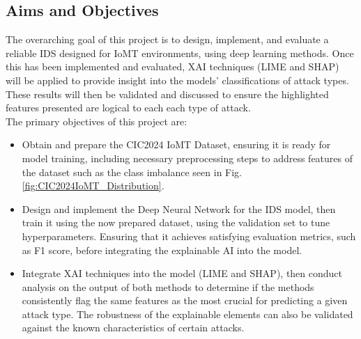 \documentclass[11pt,a4paper]{article}
\begin{document}
\subsection{Aims and Objectives}
The overarching goal of this project is to design, implement, and evaluate a reliable IDS designed for IoMT environments, using deep learning methods. Once this has been implemented and evaluated, XAI techniques (LIME and SHAP) will be applied to provide insight into the models’ classifications of attack types. These results will then be validated and discussed to ensure the highlighted features presented are logical to each each type of attack.
\\
The primary objectives of this project are: 
\begin{itemize}
    \item Obtain and prepare the CIC2024 IoMT Dataset, ensuring it is ready for model training, including necessary preprocessing steps to address features of the dataset such as the class imbalance seen in Fig. \ref{fig:CIC2024IoMT_Distribution}.
    \item Design and implement the Deep Neural Network for the IDS model, then train it using the now prepared dataset, using the validation set to tune hyperparameters. Ensuring that it achieves satisfying evaluation metrics, such as F1 score, before integrating the explainable AI into the model.
    \item Integrate XAI techniques into the model (LIME and SHAP), then conduct analysis on the output of both methods to determine if the methods consistently flag the same features as the most crucial for predicting a given attack type. The robustness of the explainable elements can also be validated against the known characteristics of certain attacks. 
\end{itemize}
\end{document}
